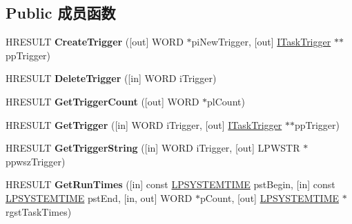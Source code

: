 \subsection*{Public 成员函数}
\begin{DoxyCompactItemize}
\item 
\mbox{\label{interface_i_scheduled_work_item_aaa0647de457a7c9ed018d4623cceb528}} 
H\+R\+E\+S\+U\+LT {\bfseries Create\+Trigger} (\mbox{[}out\mbox{]} W\+O\+RD $\ast$pi\+New\+Trigger, \mbox{[}out\mbox{]} \hyperlink{interface_i_task_trigger}{I\+Task\+Trigger} $\ast$$\ast$pp\+Trigger)
\item 
\mbox{\label{interface_i_scheduled_work_item_af1bbb277f5678e10c37d784a823d495a}} 
H\+R\+E\+S\+U\+LT {\bfseries Delete\+Trigger} (\mbox{[}in\mbox{]} W\+O\+RD i\+Trigger)
\item 
\mbox{\label{interface_i_scheduled_work_item_a3f23c8ba9c1fe79b9b23b5185faf2044}} 
H\+R\+E\+S\+U\+LT {\bfseries Get\+Trigger\+Count} (\mbox{[}out\mbox{]} W\+O\+RD $\ast$pl\+Count)
\item 
\mbox{\label{interface_i_scheduled_work_item_a3d7e13ce4a90aa89e93a54700cc2ea6d}} 
H\+R\+E\+S\+U\+LT {\bfseries Get\+Trigger} (\mbox{[}in\mbox{]} W\+O\+RD i\+Trigger, \mbox{[}out\mbox{]} \hyperlink{interface_i_task_trigger}{I\+Task\+Trigger} $\ast$$\ast$pp\+Trigger)
\item 
\mbox{\label{interface_i_scheduled_work_item_a700bd14489c37a61e55a8b12293ce6c0}} 
H\+R\+E\+S\+U\+LT {\bfseries Get\+Trigger\+String} (\mbox{[}in\mbox{]} W\+O\+RD i\+Trigger, \mbox{[}out\mbox{]} L\+P\+W\+S\+TR $\ast$ppwsz\+Trigger)
\item 
\mbox{\label{interface_i_scheduled_work_item_a67e47b3bb9db744a438bc511e8885c81}} 
H\+R\+E\+S\+U\+LT {\bfseries Get\+Run\+Times} (\mbox{[}in\mbox{]} const \hyperlink{struct___s_y_s_t_e_m_t_i_m_e}{L\+P\+S\+Y\+S\+T\+E\+M\+T\+I\+ME} pst\+Begin, \mbox{[}in\mbox{]} const \hyperlink{struct___s_y_s_t_e_m_t_i_m_e}{L\+P\+S\+Y\+S\+T\+E\+M\+T\+I\+ME} pst\+End, \mbox{[}in, out\mbox{]} W\+O\+RD $\ast$p\+Count, \mbox{[}out\mbox{]} \hyperlink{struct___s_y_s_t_e_m_t_i_m_e}{L\+P\+S\+Y\+S\+T\+E\+M\+T\+I\+ME} $\ast$rgst\+Task\+Times)

\end{DoxyCompactItemize}
